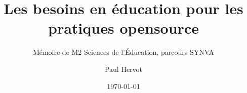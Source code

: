 \titlehead{}
\title{Les besoins en éducation pour les pratiques opensource}
\subtitle{Mémoire de M2 Sciences de l'Éducation, parcours SYNVA}
\author[PH]{Paul Hervot}
\date{\today}
\publishers{Université de Strasbourg} %

\frontmatter



\mainmatter
{}













\appendix




\backmatter



